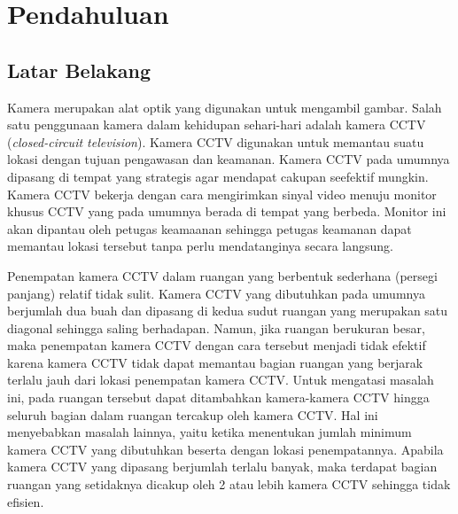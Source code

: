 \chapter{Pendahuluan}
\label{chap:intro}
   
\section{Latar Belakang}
\label{sec:label}

Kamera merupakan alat optik yang digunakan untuk mengambil gambar. Salah satu penggunaan kamera dalam kehidupan sehari-hari adalah kamera CCTV (\textit{closed-circuit television}). Kamera CCTV digunakan untuk memantau suatu lokasi dengan tujuan pengawasan dan keamanan. Kamera CCTV pada umumnya dipasang di tempat yang strategis agar mendapat cakupan seefektif mungkin. Kamera CCTV bekerja dengan cara mengirimkan sinyal video menuju monitor khusus CCTV yang pada umumnya berada di tempat yang berbeda. Monitor ini akan dipantau oleh petugas keamaanan sehingga petugas keamanan dapat memantau lokasi tersebut tanpa perlu mendatanginya secara langsung.

Penempatan kamera CCTV dalam ruangan yang berbentuk sederhana (persegi panjang) relatif tidak sulit. Kamera CCTV yang dibutuhkan pada umumnya berjumlah dua buah dan dipasang di kedua sudut ruangan yang merupakan satu diagonal sehingga saling berhadapan. Namun, jika ruangan berukuran besar, maka penempatan kamera CCTV dengan cara tersebut menjadi tidak efektif karena kamera CCTV tidak dapat memantau bagian ruangan yang berjarak terlalu jauh dari lokasi penempatan kamera CCTV. Untuk mengatasi masalah ini, pada ruangan tersebut dapat ditambahkan kamera-kamera CCTV hingga seluruh bagian dalam ruangan tercakup oleh kamera CCTV. Hal ini menyebabkan masalah lainnya, yaitu ketika menentukan jumlah minimum kamera CCTV yang dibutuhkan beserta dengan lokasi penempatannya. Apabila kamera CCTV yang dipasang berjumlah terlalu banyak, maka terdapat bagian ruangan yang setidaknya dicakup oleh 2 atau lebih kamera CCTV sehingga tidak efisien.


